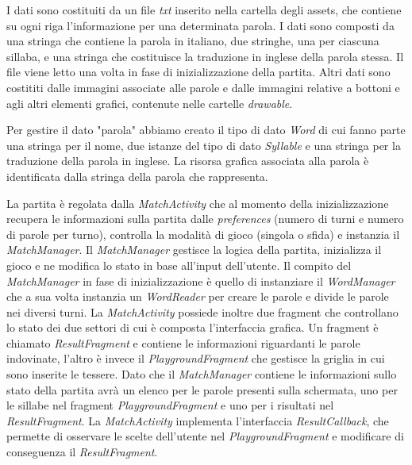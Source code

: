 
I dati sono costituiti da un file \emph{txt} inserito nella cartella degli assets, che contiene su ogni riga l'informazione per una determinata parola. I dati sono composti da una stringa che contiene la parola in italiano, due stringhe, una per ciascuna sillaba, e una stringa che costituisce la traduzione in inglese della parola stessa. Il file viene letto una volta in fase di inizializzazione della partita. Altri dati sono costititi dalle immagini associate alle parole e dalle immagini relative a bottoni e agli altri elementi grafici, contenute nelle cartelle \emph{drawable}.

Per gestire il dato "parola" abbiamo creato il tipo di dato \emph{Word} di cui fanno parte una stringa per il nome, due istanze del tipo di dato \emph{Syllable} e una stringa per la traduzione della parola in inglese. La risorsa grafica associata alla parola è identificata dalla stringa della parola che rappresenta.


La partita è regolata dalla \emph{MatchActivity} che al momento della inizializzazione recupera le informazioni sulla partita dalle \emph{preferences} (numero di turni e numero di parole per turno), controlla la modalità di gioco (singola o sfida) e instanzia il \emph{MatchManager}. Il \emph{MatchManager} gestisce la logica della partita, inizializza il gioco e ne modifica lo stato in base all'input dell'utente. Il compito del \emph{MatchManager} in fase di inizializzazione è quello di instanziare il \emph{WordManager} che a sua volta instanzia un \emph{WordReader} per creare le parole e divide le parole nei diversi turni. La \emph{MatchActivity} possiede inoltre due fragment che controllano lo stato dei due settori di cui è composta l'interfaccia grafica. Un fragment è chiamato \emph{ResultFragment} e contiene le informazioni riguardanti le parole indovinate, l'altro è invece il \emph{PlaygroundFragment} che gestisce la griglia in cui sono inserite le tessere. Dato che il \emph{MatchManager} contiene le informazioni sullo stato della partita avrà un elenco per le parole presenti sulla schermata, uno per le sillabe nel fragment \emph{PlaygroundFragment} e uno per i risultati nel \emph{ResultFragment}. La \emph{MatchActivity} implementa l'interfaccia \emph{ResultCallback}, che permette di osservare le scelte dell'utente nel \emph{PlaygroundFragment} e modificare di conseguenza il \emph{ResultFragment}. 

